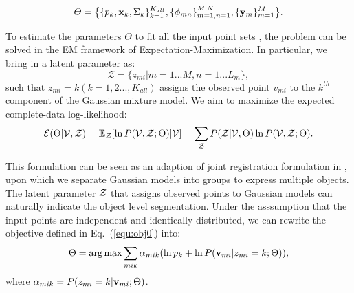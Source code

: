 

%
\begin{displaymath}
\varTheta=\big \{\{p_k,\mathbf{x}_k,\Sigma_k\}_{k=1}^{K_{all}},\{\phi_{mn}\}_{m=1,n=1}^{M,N}, \{\mathbf{y}_{m}\}^{M}_{m=1}\big\}.
\end{displaymath}
 

To estimate the parameters $\Theta$ to fit all the input point sets , the problem can be solved in the EM framework of Expectation-Maximization. 
%
In particular, we bring in a latent parameter as: 
\begin{equation}
\mathcal{Z}=\{z_{mi}|m=1...M,n=1...L_m\},
\end{equation}
%
such that $z_{mi}=k(k=1,2...,K_{all})$ assigns the observed point $v_{mi}$ to the $k^{th}$ component of the Gaussian mixture model. 
%
We aim to maximize the expected complete-data log-likelihood:
\begin{equation}
\label{equ:obj0}
\mathcal{E}(\Theta|\mathcal{V},\mathcal{Z})=\mathbb{E}_{\mathcal{Z}}[\ln P(\mathcal{V},\mathcal{Z};\Theta)|\mathcal{V}]={\sum_{\mathcal{Z}}P(\mathcal{Z}|\mathcal{V},\Theta)\ln{P(\mathcal{V},\mathcal{Z};\Theta)}}.
\end{equation}


This formulation can be seen as an adaption of  joint registration formulation in \cite{Evangelidis2014}, upon which we separate Gaussian models into groups to express multiple objects. 
%
The latent parameter $\mathcal{Z}$ that assigns observed points to Gaussian models can naturally indicate the object level segmentation.
%
Under the asssumption  that the input points are independent and identically distributed, we can rewrite the objective defined in Eq.~(\ref{equ:obj0}) into:
%
\begin{equation} \label{equ:obj2}
\Theta=\arg\max\sum_{mik}\alpha_{mik}(\ln p_k + \ln P(\mathbf{v}_{mi}|z_{mi}=k;\Theta)),
\end{equation}
%
where $\alpha_{mik} = P( z_{mi} = k | \mathbf{v}_{mi} ; \Theta )$.


